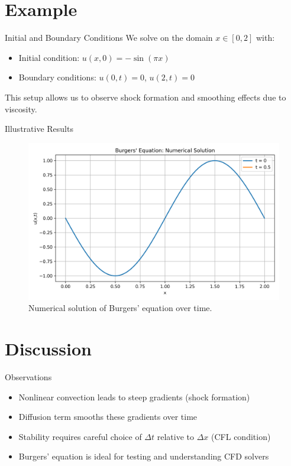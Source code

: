 \documentclass{beamer}
\begin{document}
\section{Example}
\begin{frame}{Initial and Boundary Conditions}
We solve on the domain $x \in [0,2]$ with:

\begin{itemize}
    \item Initial condition: $u(x,0) = -\sin(\pi x)$
    \item Boundary conditions: $u(0,t) = 0$, $u(2,t) = 0$
\end{itemize}

This setup allows us to observe shock formation and smoothing effects due to viscosity.
\end{frame}

\begin{frame}{Illustrative Results}
\begin{figure}[h]
\centering
\includegraphics[width=0.8\linewidth]{burgers_plot.png} %
\caption{Numerical solution of Burgers' equation over time.}
\end{figure}
\end{frame}

\section{Discussion}
\begin{frame}{Observations}
\begin{itemize}
    \item Nonlinear convection leads to steep gradients (shock formation)
    \item Diffusion term smooths these gradients over time
    \item Stability requires careful choice of $\Delta t$ relative to $\Delta x$ (CFL condition)
    \item Burgers' equation is ideal for testing and understanding CFD solvers
\end{itemize}
\end{frame}
\end{document}
